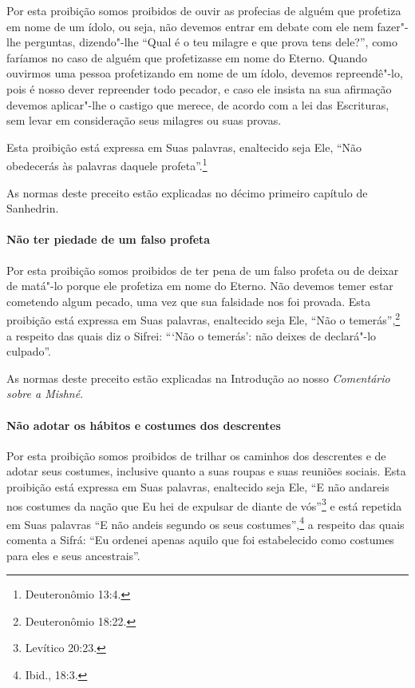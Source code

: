 \begin{multicols}{2}
Por esta proibição somos proibidos de ouvir as profecias de alguém que
profetiza em nome de um ídolo, ou seja, não devemos entrar em debate com
ele nem fazer"-lhe perguntas, dizendo"-lhe ``Qual é o teu milagre e que
prova tens dele?'', como faríamos no caso de alguém que profetizasse em
nome do Eterno. Quando ouvirmos uma pessoa profetizando em nome de um
ídolo, devemos repreendê"-lo, pois é nosso dever repreender todo pecador,
e caso ele insista na sua afirmação devemos aplicar"-lhe o castigo que
merece, de acordo com a lei das Escrituras, sem levar em consideração
seus milagres ou suas provas.

Esta proibição está expressa em Suas palavras, enaltecido seja Ele,
``Não obedecerás às palavras daquele profeta''.\footnote{Deuteronômio 13:4.}

As normas deste preceito estão explicadas no décimo primeiro capítulo
de Sanhedrin\starr.

\paragraph{Não ter piedade de um falso profeta}

Por esta proibição somos proibidos de ter pena de um falso profeta ou de
deixar de matá"-lo porque ele profetiza em nome do Eterno. Não devemos
temer estar cometendo algum pecado, uma vez que sua falsidade nos foi
provada. Esta proibição está expressa em Suas palavras, enaltecido seja
Ele, ``Não o temerás'',\footnote{Deuteronômio 18:22.} a respeito das quais diz o
Sifrei\starr: ```Não o temerás': não deixes de declará"-lo culpado''.

As normas deste preceito estão explicadas na Introdução ao nosso
\emph{Comentário sobre a Mishné}.

\paragraph{Não adotar os hábitos e costumes dos descrentes}

Por esta proibição somos proibidos de trilhar os caminhos dos descrentes
e de adotar seus costumes, inclusive quanto a suas roupas e suas
reuniões sociais. Esta proibição está expressa em Suas palavras,
enaltecido seja Ele, ``E não andareis nos costumes da nação que Eu hei
de expulsar de diante de vós''\footnote{Levítico 20:23.} e está repetida em Suas
palavras ``E não andeis segundo os seus costumes'',\footnote{Ibid., 18:3.} a
respeito das quais comenta a Sifrá\starr: ``Eu ordenei apenas aquilo que foi
estabelecido como costumes para eles e seus ancestrais''.


\end{multicols}
